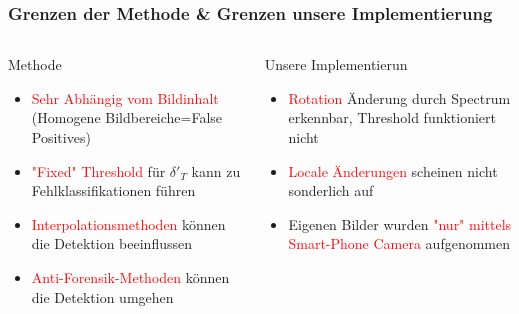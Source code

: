 \documentclass[11pt,t,usepdftitle=false,aspectratio=169]{beamer}
\begin{document}
\begin{frame}
	\frametitle{Grenzen der Methode \& Grenzen unsere Implementierung}
	
	\begin{columns}[T]
		\begin{column}{0.48\textwidth}
			\begin{alertblock}{Methode}
				\begin{itemize}
					\item \textcolor{red}{Sehr Abhängig vom Bildinhalt} (Homogene Bildbereiche=False Positives)
					\item \textcolor{red}{"Fixed" Threshold} für $\delta'_T$ kann zu Fehlklassifikationen führen
					\item \textcolor{red}{Interpolationsmethoden} können die Detektion beeinflussen
					\item \textcolor{red}{Anti-Forensik-Methoden} können die Detektion umgehen~\cite{kirchner_hiding_2008}
				\end{itemize}
			\end{alertblock}
		\end{column}
		\begin{column}{0.48\textwidth}
			\begin{exampleblock}{Unsere Implementierun}
				\begin{itemize}
					\item \textcolor{red}{Rotation} Änderung durch Spectrum erkennbar, Threshold funktioniert nicht
					\item \textcolor{red}{Locale Änderungen} scheinen nicht sonderlich auf
					\item Eigenen Bilder wurden \textcolor{red}{"nur" mittels Smart-Phone Camera} aufgenommen
				\end{itemize}
			\end{exampleblock}
		\end{column}
	\end{columns}
\end{frame}
\end{document}
